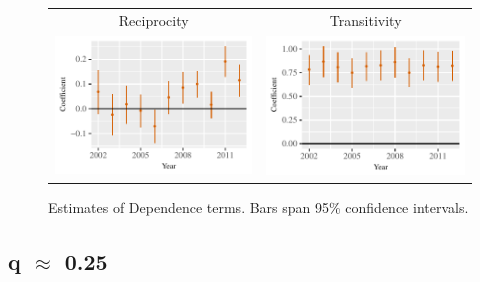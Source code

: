 \documentclass[reqno,onecolumn,letterpaper,12pt]{article}
\begin{document}
{\begin{figure}[!h]
\centering
\begin{tabular}{c@{\hskip 0cm}c}
Reciprocity & Transitivity \\
\includegraphics[height=.2\textheight, clip=true, trim=0cm 0cm 0cm .2cm]{draft_figures/rl_plots50/Mutuality.pdf}    &
\includegraphics[height=.2\textheight, clip=true, trim=0cm 0cm 0cm .2cm]{draft_figures/rl_plots50/Transitivity.pdf}
\end{tabular}
\caption{\label{fig:q50netterms} Estimates of Dependence terms. Bars span 95\% confidence intervals. }
\end{figure}





\subsection{q $\approx$  0.25}

}
\end{document}
